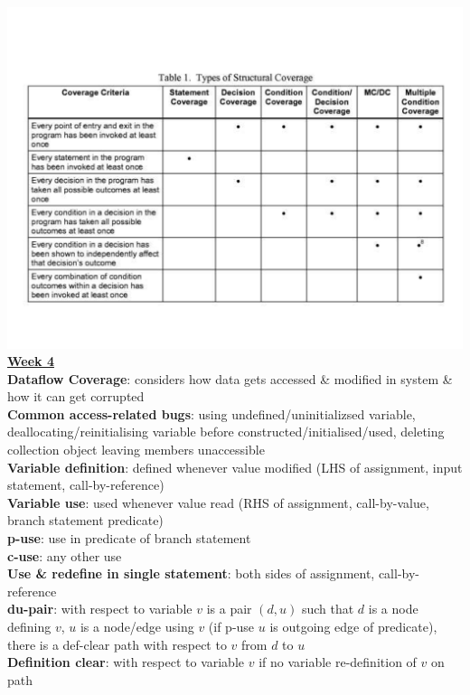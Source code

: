 \documentclass[a4paper]{article}
\begin{document}
\begin{multicols}{3}
        \includegraphics[width=\linewidth]{152.pdf}\\
        \underline{\textbf{Week 4}}\\
        \textbf{Dataflow Coverage}: considers how data gets accessed \& modified in system \& how it can get corrupted\\
        \textbf{Common access-related bugs}: using undefined/uninitializsed variable, deallocating/reinitialising variable before constructed/initialised/used, deleting collection object leaving members unaccessible\\
        \textbf{Variable definition}: defined whenever value modified (LHS of assignment, input statement, call-by-reference)\\
        \textbf{Variable use}: used whenever value read (RHS of assignment, call-by-value, branch statement predicate)\\
        \textbf{p-use}: use in predicate of branch statement\\
        \textbf{c-use}: any other use\\
        \textbf{Use \& redefine in single statement}: both sides of assignment, call-by-reference\\
        \textbf{du-pair}: with respect to variable $v$ is a pair $(d,u)$ such that $d$ is a node defining $v$, $u$ is a node/edge using $v$ (if p-use $u$ is outgoing edge of predicate), there is a def-clear path with respect to $v$ from $d$ to $u$\\
        \textbf{Definition clear}: with respect to variable $v$ if no variable re-definition of $v$ on path\\

\end{multicols}
\end{document}
